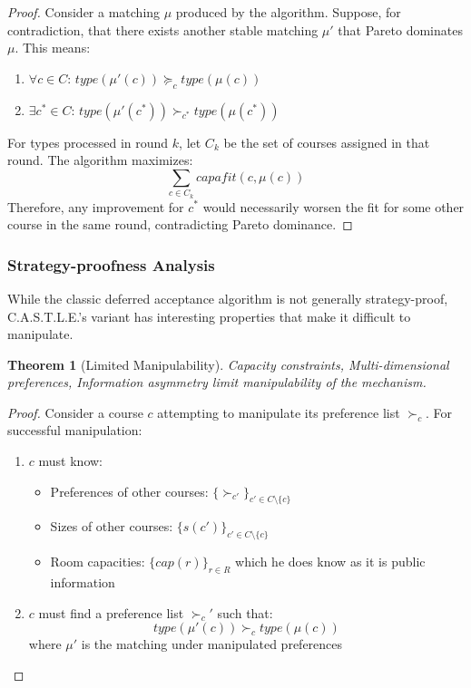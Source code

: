 \documentclass[a4paper, oneside]{article}
\theoremstyle{plain}
\newtheorem{theorem}{Theorem}
\newcommand{\castle}{C{\small.}A{\small.}S{\small.}T{\small.}L{\small.}E{\small.}}
\begin{document}
\begin{proof}
	Consider a matching $\mu$ produced by the algorithm. Suppose, for contradiction, that there exists another stable matching $\mu'$ that Pareto dominates $\mu$.
	This means:
	\begin{enumerate}
		\item $\forall c \in C$: $type(\mu'(c)) \succeq_c type(\mu(c))$
		\item $\exists c^* \in C$: $type(\mu'(c^*)) \succ_{c^*} type(\mu(c^*))$
	\end{enumerate}
	For types processed in round $k$, let $C_k$ be the set of courses assigned in that round. The algorithm maximizes:
	$$\sum_{c \in C_k} capafit(c, \mu(c))$$
	Therefore, any improvement for $c^*$ would necessarily worsen the fit for some other course in the same round, contradicting Pareto dominance.
\end{proof}

\subsubsection{Strategy-proofness Analysis}

While the classic deferred acceptance algorithm is not generally strategy-proof, \castle{}'s variant has interesting properties that make it difficult to manipulate.
\begin{theorem}[Limited Manipulability]
	Capacity constraints, Multi-dimensional preferences, Information asymmetry limit manipulability of the mechanism.
\end{theorem}

\begin{proof}
	Consider a course $c$ attempting to manipulate its preference list $\succ_c$. For successful manipulation:
	\begin{enumerate}
		\item $c$ must know:
		      \begin{itemize}
			      \item Preferences of other courses: $\{\succ_{c'}\}_{c' \in C\setminus\{c\}}$
			      \item Sizes of other courses: $\{s(c')\}_{c' \in C\setminus\{c\}}$
			      \item Room capacities: $\{cap(r)\}_{r \in R}$ which he does know as it is public information
		      \end{itemize}
		\item $c$ must find a preference list $\succ_c'$ such that:
		      $$type(\mu'(c)) \succ_c type(\mu(c))$$
		      where $\mu'$ is the matching under manipulated preferences
	\end{enumerate}
\end{proof}
\end{document}
